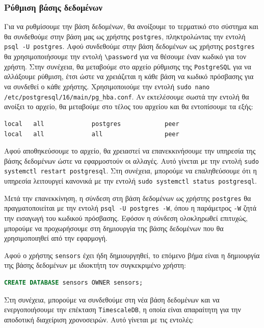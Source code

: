 \documentclass[a4paper,12pt]{article}
\begin{document}
\subsubsection{Ρύθμιση βάσης δεδομένων}\label{sec:database_configuration}
Για να ρυθμίσουμε την βάση δεδομένων, θα ανοίξουμε το τερματικό στο σύστημα και θα συνδεθούμε στην βάση μας ως χρήστης \texttt{postgres}, πληκτρολώντας την εντολή \texttt{psql -U postgres}. Αφού συνδεθούμε στην βάση δεδομένων ως χρήστης \texttt{postgres} θα χρησιμοποιήσουμε την εντολή \texttt{\textbackslash password} για να θέσουμε έναν κωδικό για τον χρήστη. Στην συνέχεια, θα μεταβούμε στο αρχείο ρύθμισης της \texttt{PostgreSQL} για να αλλάξουμε ρύθμιση, έτσι ώστε να χρειάζεται η κάθε βάση να κωδικό πρόσβασης για να συνδεθεί ο κάθε χρήστης. Χρησιμοποιούμε την εντολή \lstinline|sudo nano /etc/postgresql/16/main/pg_hba.conf|. Αν εκτελέσουμε σωστά την εντολή θα ανοίξει το αρχείο, θα μεταβούμε στο τέλος του αρχείου και θα εντοπίσουμε τα εξής:

\begin{lstlisting}
local   all             postgres            peer
local   all             all                 peer
\end{lstlisting}

Αφού αποθηκεύσουμε το αρχείο, θα χρειαστεί να επανεκκινήσουμε την υπηρεσία της βάσης δεδομένων ώστε να εφαρμοστούν οι αλλαγές. Αυτό γίνεται με την εντολή \lstinline|sudo systemctl restart postgresql|. Στη συνέχεια, μπορούμε να επαληθεύσουμε ότι η υπηρεσία λειτουργεί κανονικά με την εντολή \lstinline|sudo systemctl status postgresql|.

Μετά την επανεκκίνηση, η σύνδεση στη βάση δεδομένων ως χρήστης \texttt{postgres} θα πραγματοποιείται με την εντολή \lstinline|psql -U postgres -W|, όπου η παράμετρος \texttt{-W} ζητά την εισαγωγή του κωδικού πρόσβασης. Εφόσον η σύνδεση ολοκληρωθεί επιτυχώς, μπορούμε να προχωρήσουμε στη δημιουργία της βάσης δεδομένων που θα χρησιμοποιηθεί από την εφαρμογή.

Αφού ο χρήστης \texttt{sensors} έχει ήδη δημιουργηθεί, το επόμενο βήμα είναι η δημιουργία της βάσης δεδομένων με ιδιοκτήτη τον συγκεκριμένο χρήστη:

\begin{lstlisting}[language=SQL]
CREATE DATABASE sensors OWNER sensors;
\end{lstlisting}

Στη συνέχεια, μπορούμε να συνδεθούμε στη νέα βάση δεδομένων και να ενεργοποιήσουμε την επέκταση \texttt{TimescaleDB}, η οποία είναι απαραίτητη για την αποδοτική διαχείριση χρονοσειρών. Αυτό γίνεται με τις εντολές:
\end{document}
